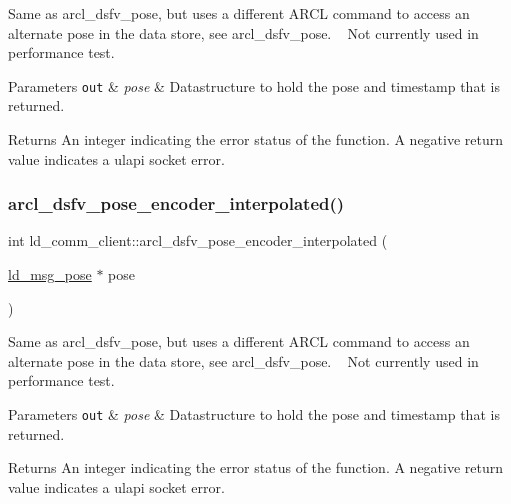 Same as arcl\+\_\+dsfv\+\_\+pose, but uses a different A\+R\+CL command to access an alternate pose in the data store, see arcl\+\_\+dsfv\+\_\+pose. ~\newline
Not currently used in performance test. 
\begin{DoxyParams}[1]{Parameters}
\mbox{\tt out}  & {\em pose} & Datastructure to hold the pose and timestamp that is returned. \\
\hline
\end{DoxyParams}
\begin{DoxyReturn}{Returns}
An integer indicating the error status of the function. A negative return value indicates a ulapi socket error. 
\end{DoxyReturn}
\mbox{\label{classld__comm__client_a0b983bc131cfc619e8ab8785daef32e8}} 
\subsubsection{\texorpdfstring{arcl\+\_\+dsfv\+\_\+pose\+\_\+encoder\+\_\+interpolated()}{arcl\_dsfv\_pose\_encoder\_interpolated()}}
{\footnotesize\ttfamily int ld\+\_\+comm\+\_\+client\+::arcl\+\_\+dsfv\+\_\+pose\+\_\+encoder\+\_\+interpolated (\begin{DoxyParamCaption}\item[{\hyperlink{structld__msg__pose}{ld\+\_\+msg\+\_\+pose} $\ast$}]{pose }\end{DoxyParamCaption})}

Same as arcl\+\_\+dsfv\+\_\+pose, but uses a different A\+R\+CL command to access an alternate pose in the data store, see arcl\+\_\+dsfv\+\_\+pose. ~\newline
Not currently used in performance test. 
\begin{DoxyParams}[1]{Parameters}
\mbox{\tt out}  & {\em pose} & Datastructure to hold the pose and timestamp that is returned. \\
\hline
\end{DoxyParams}
\begin{DoxyReturn}{Returns}
An integer indicating the error status of the function. A negative return value indicates a ulapi socket error. 
\end{DoxyReturn}
\mbox{\label{classld__comm__client_a1cbdd2fcd2ea8d7d4072c3953ce5f11d}} 
